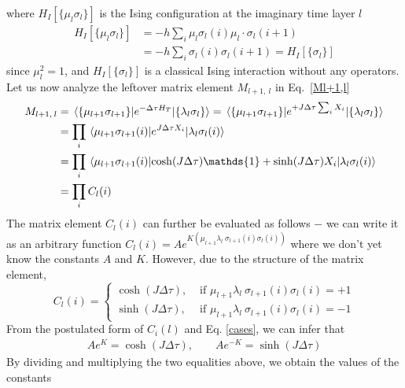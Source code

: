 \documentclass[../thesis_main.tex]{subfiles}
\begin{document}
\endgroup
where $H_I[\{\mu_l \sigma_l\}]$ is the Ising configuration at the imaginary time layer $l$  
\begingroup
\allowdisplaybreaks
\begin{align}
    H_I[\{\mu_l \sigma_l\}] &= -h \sum_i \mu_l \sigma_l(i) \mu_l \cdot \sigma_l (i+1) \nonumber \\
    &= -h \sum_i \sigma_l(i) \sigma_l (i+1) = H_I[\{\sigma_l\}]
    \label{isingterm}
\end{align}
\endgroup
since $\mu_l^2 = 1$, and $H_I[\{\sigma_l\}]$ is a classical Ising interaction without any operators. Let us now analyze the leftover matrix element $M_{l+1, \:l}$ in Eq.~\eqref{Ml+1,l}
\begingroup
\allowdisplaybreaks
\begin{align}
    M_{l+1, \: l} &= \mel{\{\mu_{l+1} \sigma_{l+1}\}}{e^{-\Delta \tau H_T}}{\{\lambda_l \sigma_l\}} = \mel{\{\mu_{l+1} \sigma_{l+1}\}}{e^{+ J\Delta \tau \sum_{i} X_i}}{\{\lambda_l \sigma_l\}} \nonumber \\
    & = \prod_{i} \mel{\mu_{l+1} \sigma_{l+1}(i)}{e^{J \Delta \tau X_i}}{\lambda_{l} \sigma_l(i)} \nonumber \\
    & = \prod_{i} \mel{\mu_{l+1} \sigma_{l+1}(i)}{\cosh(J \Delta \tau) \mathds{1} + \sinh(J \Delta \tau)X_i }{\lambda_{l} \sigma_l(i)} \nonumber \\
    & = \prod_{i} C_l(i)
    \label{matrixelement}
\end{align}
\endgroup
The matrix element $C_l(i)$ can further be evaluated as follows $-$ we can write it as an arbitrary function $C_l(i) = A e^{K(\mu_{l+1}\lambda_l \: \sigma_{l+1}(i)\sigma_{l}(i))}$ where we don't yet know the constants $A$ and $K$. However, due to the structure of the matrix element,
\begin{equation}
    C_l(i) = 
    \begin{cases}
    \cosh(J \Delta \tau), & \text{ if } \mu_{l+1}\lambda_l \: \sigma_{l+1}(i)\sigma_{l}(i) = +1 \\
    \sinh(J \Delta \tau), & \text{ if } \mu_{l+1}\lambda_l \: \sigma_{l+1}(i)\sigma_{l}(i) = -1       
    \end{cases}
    \label{cases}
\end{equation}
From the postulated form of $C_i(l)$ and Eq. \eqref{cases}, we can infer that 
\begingroup
\allowdisplaybreaks
\begin{align}
A e^{K} = \cosh(J \Delta \tau), \qquad A e^{-K} = \sinh(J \Delta \tau)
\end{align}
\endgroup
By dividing and multiplying the two equalities above, we obtain the values of the constants
\end{document}
